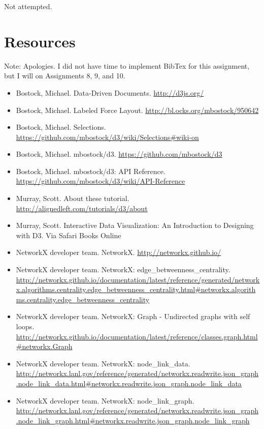 \documentclass{article}
\begin{document}
Not attempted.



\newpage

\section*{Resources}

Note: Apologies. I did not have time to implement BibTex for this assignment, but I will on Assignments 8, 9, and 10.

\begin{itemize}
\item Bostock, Michael. Data-Driven Documents. \url{http://d3js.org/}
\item Bostock, Michael. Labeled Force Layout. \url{http://bl.ocks.org/mbostock/950642}
\item Bostock, Michael. Selections. \url{https://github.com/mbostock/d3/wiki/Selections#wiki-on}
\item Bostock, Michael. mbostock/d3. \url{https://github.com/mbostock/d3}
\item Bostock, Michael. mbostock/d3: API Reference. \url{https://github.com/mbostock/d3/wiki/API-Reference}
\item Murray, Scott. About these tutorial. \url{http://alignedleft.com/tutorials/d3/about}
\item Murray, Scott. Interactive Data Visualization: An Introduction to Designing with D3. Via Safari Books Online
\item NetworkX developer team. NetworkX. \url{http://networkx.github.io/}
\item NetworkX developer team. NetworkX: edge\_betweenness\_centrality. \url{http://networkx.github.io/documentation/latest/reference/generated/networkx.algorithms.centrality.edge_betweenness_centrality.html#networkx.algorithms.centrality.edge_betweenness_centrality}
\item NetworkX developer team. NetworkX: Graph - Undirected graphs with self loops. \url{http://networkx.github.io/documentation/latest/reference/classes.graph.html#networkx.Graph}
\item NetworkX developer team. NetworkX: node\_link\_data. \url{http://networkx.lanl.gov/reference/generated/networkx.readwrite.json_graph.node_link_data.html#networkx.readwrite.json_graph.node_link_data}
\item NetworkX developer team. NetworkX: node\_link\_graph. \url{http://networkx.lanl.gov/reference/generated/networkx.readwrite.json_graph.node_link_graph.html#networkx.readwrite.json_graph.node_link_graph}

\end{itemize}
\end{document}
